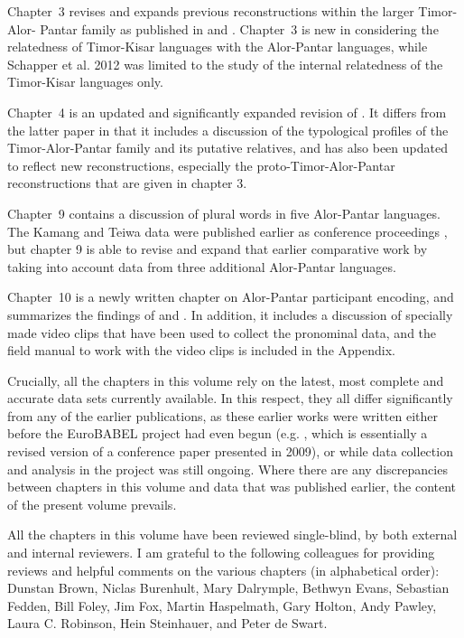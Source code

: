 \documentclass[output=paper]{LSP/langsci}
\begin{document}
Chapter~3 revises and expands previous reconstructions within the larger Timor-Alor- Pantar family as published in \citet{HoltonEtAl2012} and \citet{SchapperEtAl2012}. Chapter~3 is new in considering the relatedness of Timor-Kisar languages with the Alor-Pantar languages, while Schapper et al. 2012 was limited to the study of the internal relatedness of the Timor-Kisar languages only.

Chapter~4 is an updated and significantly expanded revision of \citet{RobinsonEtAl2012reassessing}. It differs from the latter paper in that it includes a discussion of the typological profiles of the Timor-Alor-Pantar family and its putative relatives, and has also been updated to reflect new reconstructions, especially the proto-Timor-Alor-Pantar reconstructions that are given in chapter 3. 

Chapter~9 contains a discussion of plural words in five Alor-Pantar languages. The Kamang and Teiwa data were published earlier as conference proceedings \citep{SchapperEtAl2011plural}, but chapter 9 is able to revise and expand that earlier comparative work by taking into account data from three additional Alor-Pantar languages.

Chapter~10 is a newly written chapter on Alor-Pantar participant encoding, and summarizes the findings of \citet{FeddenEtAl2013} and \citet{FeddenEtAl2014}. In addition, it includes a discussion of specially made video clips that have been used to collect the pronominal data, and the field manual to work with the video clips is included in the Appendix.

Crucially, all the chapters in this volume rely on the latest, most complete and accurate data sets currently available. In this respect, they all differ significantly from any of the earlier publications, as these earlier works were written either before the EuroBABEL project had even begun (e.g. \citet{HoltonEtAl2012}, which is essentially a revised version of a conference paper presented in 2009), or while data collection and analysis in the project was still ongoing. Where there are any discrepancies between chapters in this volume and data that was published earlier, the content of the present volume prevails.

All the chapters in this volume have been reviewed single-blind, by both external and internal reviewers. I am grateful to the following colleagues for providing reviews and helpful comments on the various chapters (in alphabetical order): Dunstan Brown, Niclas Burenhult, Mary Dalrymple, Bethwyn Evans, Sebastian Fedden, Bill Foley, Jim Fox, Martin Haspelmath, Gary Holton, Andy Pawley, Laura C. Robinson, Hein Steinhauer, and Peter de Swart.
	
\end{document}
